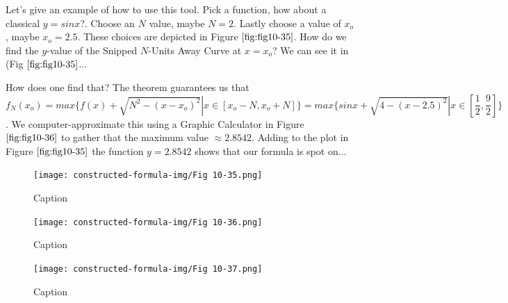 Let's give an example of how to use this tool. Pick a function, how about a classical $y = sin x$?. Choose an $N$ value, maybe $N = 2$. Lastly choose a value of $x_o$, maybe $x_o = 2.5$. These choices are depicted in Figure $\ref{fig:fig10-35}$. How do we find the $y$-value of the Snipped $N$-Units Away Curve at $x = x_o$? We can see it in (Fig $\ref{fig:fig10-35}$... 

How does one find that? The theorem guarantees us that $f_N(x_o) = max \{ f(x) + \sqrt{N^2 - (x - x_o)^2} | x \in [ x_o - N, x_o + N] \} = max \{ sin x + \sqrt{4 - (x - 2.5)^2} | x \in [\dfrac{1}{2}, \dfrac{9}{2}]\}$. We computer-approximate this using a Graphic Calculator in Figure $\ref{fig:fig10-36}$ to gather that the maximum value $\approx 2.8542$. Adding to the plot in Figure $\ref{fig:fig10-35}$ the function $y = 2.8542$ shows that our formula is spot on...

\begin{figure}[H]
    \centering
    \begin{minipage}[b]{0.3\linewidth}
        \texttt{[image: constructed-formula-img/Fig 10-35.png]}
        \caption{Caption}
        \label{fig:fig10-35}
    \end{minipage}
    \begin{minipage}[b]{0.3\linewidth}
        \texttt{[image: constructed-formula-img/Fig 10-36.png]}
        \caption{Caption}
        \label{fig:fig10-36}
    \end{minipage}
    \begin{minipage}[b]{0.3\linewidth}
        \texttt{[image: constructed-formula-img/Fig 10-37.png]}
        \caption{Caption}
        \label{fig:fig10-37}
    \end{minipage}
\end{figure}